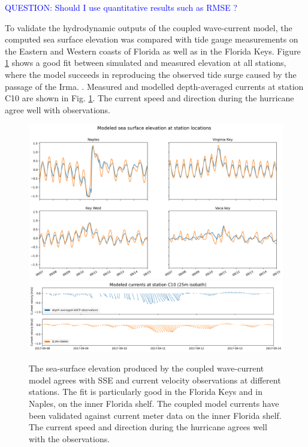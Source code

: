 \documentclass[11pt,a4paper]{article}
\begin{document}
\textcolor{blue}{QUESTION: Should I use quantitative results such as RMSE ?}

To validate the hydrodynamic outputs of the coupled wave-current model, the computed sea surface elevation was compared with tide gauge measurements on the Eastern and Western coasts of Florida as well as in the Florida Keys. Figure \ref{fig:hydro} shows a good fit between simulated and measured elevation at all stations, where the model succeeds in reproducing the observed tide surge caused by the passage of the Irma. . Measured and modelled depth-averaged currents at station C10 are shown in Fig. \ref{fig:hydro}. The current speed and direction during the hurricane agree well with observations.

\begin{figure}
    \centering
    \includegraphics[width=.95\textwidth]{fig/elevation_with_map.png}
    \includegraphics[width=.95\textwidth]{fig/validation_currents_C10_ww3.png}
    \caption{The sea-surface elevation produced by the coupled wave-current model agrees with SSE and current velocity observations at different stations. The fit is particularly good in the Florida Keys and in Naples, on the inner Florida shelf. The coupled model currents have been validated against current meter data on the inner Florida shelf. The current speed and direction during the hurricane agrees well with the observations.}
    \label{fig:hydro}
\end{figure}
\end{document}
